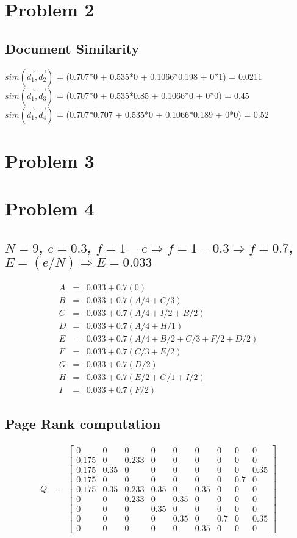 \documentclass{article}
\begin{document}
\section[B]{Problem 2}
\subsection {Document Similarity}
$sim(\vec{d_1},\vec{d_2})$ = (0.707*0 + 0.535*0 + 0.1066*0.198 + 0*1) = 0.0211 \\
$sim(\vec{d_1},\vec{d_3})$ = (0.707*0 + 0.535*0.85 + 0.1066*0 + 0*0) = 0.45 \\
$sim(\vec{d_1},\vec{d_4})$ = (0.707*0.707 + 0.535*0 + 0.1066*0.189 + 0*0) = 0.52 \\


\section[C]{Problem 3}
\section[D]{Problem 4}
\subsection{ $N = 9$, $e = 0.3$, $f = 1 - e \Rightarrow f = 1 - 0.3 \Rightarrow f = 0.7$, $E = (e/N) \Rightarrow E = 0.033$}
\[
\begin{array}{rcl}A & = & 0.033 + 0.7(0)\\ B & = & 0.033 + 0.7(A/4 + C/3) \\ C & = & 0.033 + 0.7(A/4 + I/2 + B/2) \\ D & = & 0.033 + 0.7(A/4 + H/1) \\ E & = &0.033 + 0.7(A/4+B/2 + C/3 + F/2 + D/2) \\ F & = & 0.033 + 0.7(C/3 + E/2) \\ G & = & 0.033 + 0.7(D/2) \\ H & = & 0.033 + 0.7(E/2 + G/1 + I/2) \\ I & = & 0.033 + 0.7(F/2)
\end{array}
\]
\subsection{\textbf{Page Rank computation}}
\[
\begin{array}{lcl}Q & = &
\begin{bmatrix} 0 & 0 & 0 & 0 & 0 & 0 & 0 & 0 & 0 \\ 0.175 & 0 & 0.233 & 0 & 0 & 0 & 0 & 0 & 0 \\ 0.175 & 0. 35 & 0 & 0 & 0 & 0 & 0 & 0 & 0.35 \\ 0.175 & 0 & 0 & 0 & 0& 0 & 0 & 0.7 & 0 \\ 0.175 & 0.35 & 0.233 & 0.35 & 0 & 0.35 & 0 & 0 & 0 \\ 0 & 0 & 0.233 & 0 & 0.35 & 0 & 0 & 0 & 0 \\ 0 & 0 & 0 & 0.35 & 0 & 0 & 0 & 0 & 0 \\ 0 & 0 & 0 & 0 & 0.35 & 0 & 0.7 & 0 & 0.35 \\ 0 & 0 & 0 & 0 & 0 & 0.35 & 0 & 0 & 0
\end{bmatrix}
\end{array}
\]
\end{document}
